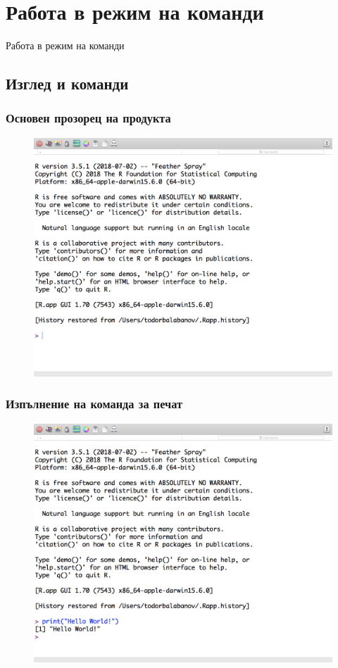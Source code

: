 \documentclass{beamer}
\begin{document}
\section{Работа в режим на команди}

\begin{frame}
\center \huge{Работа в режим на команди}
\end{frame}

\subsection{Изглед и команди}

\begin{frame}
\frametitle{Основен прозорец на продукта}
\begin{figure}[]\includegraphics[width=\textwidth,height=0.75\textheight]{pic0012}\end{figure}
\end{frame}

\begin{frame}
\frametitle{Изпълнение на команда за печат}
\begin{figure}[]\includegraphics[width=\textwidth,height=0.75\textheight]{pic0013}\end{figure}
\end{frame}
\end{document}
